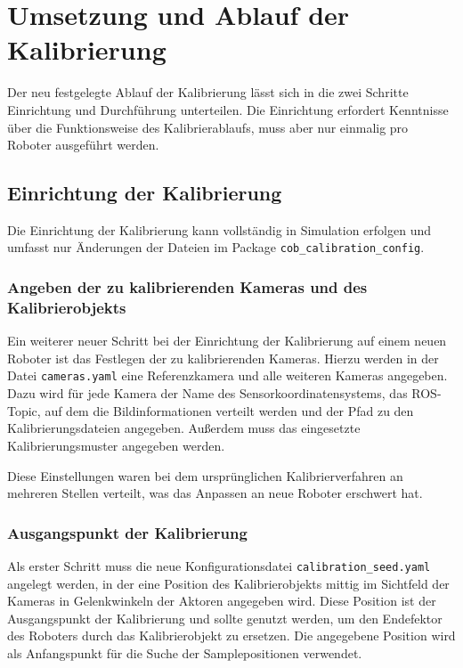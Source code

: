 \chapter{Umsetzung und Ablauf der Kalibrierung}

Der neu festgelegte Ablauf der Kalibrierung lässt sich in die zwei Schritte 
Einrichtung und Durchführung unterteilen. Die Einrichtung erfordert Kenntnisse
über die Funktionsweise des Kalibrierablaufs, muss aber nur einmalig pro Roboter
ausgeführt werden.

\section{Einrichtung der Kalibrierung}
\label{sec:Einrichtung der Kalibrierung}

Die Einrichtung der Kalibrierung kann vollständig in Simulation erfolgen und 
umfasst nur Änderungen der Dateien im Package \texttt{cob\_calibration\_config}. 


\subsection{Angeben der zu kalibrierenden Kameras und des Kalibrierobjekts}
\label{sub:Angeben der zu kalibrierenden Kameras}

Ein weiterer neuer Schritt bei der Einrichtung der Kalibrierung auf einem neuen
Roboter ist das Festlegen der zu kalibrierenden Kameras. Hierzu werden in der 
Datei \texttt{cameras.yaml} eine Referenzkamera und alle weiteren Kameras angegeben.
Dazu wird für jede Kamera der Name des Sensorkoordinatensystems, das
\ac{ROS}-Topic, auf dem die Bildinformationen verteilt werden und der Pfad zu den
Kalibrierungsdateien angegeben. Außerdem muss das eingesetzte Kalibrierungsmuster
angegeben werden. 

Diese Einstellungen waren bei dem ursprünglichen Kalibrierverfahren an mehreren 
Stellen verteilt, was das Anpassen an neue Roboter erschwert hat.
\subsection{Ausgangspunkt der Kalibrierung}
\label{sub:Ausgangspunkt der Kalibrierung}

Als
erster Schritt muss die neue Konfigurationsdatei \texttt{calibration\_seed.yaml} 
angelegt werden, in der eine Position des Kalibrierobjekts mittig im Sichtfeld
der Kameras in Gelenkwinkeln der Aktoren angegeben wird. Diese Position ist der Ausgangspunkt
der Kalibrierung und sollte genutzt werden, um den Endefektor des Roboters durch 
das Kalibrierobjekt zu ersetzen. Die angegebene Position wird als Anfangspunkt 
für die Suche der Samplepositionen verwendet.

